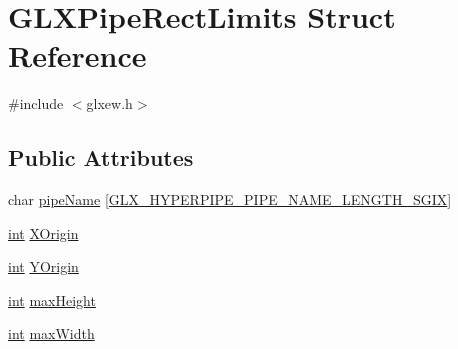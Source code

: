 \hypertarget{struct_g_l_x_pipe_rect_limits}{\section{G\-L\-X\-Pipe\-Rect\-Limits Struct Reference}
\label{struct_g_l_x_pipe_rect_limits}
}


{\ttfamily \#include $<$glxew.\-h$>$}

\subsection*{Public Attributes}
\begin{DoxyCompactItemize}
\item 
char \hyperlink{struct_g_l_x_pipe_rect_limits_a048e870a1e04bc5321d629e803cc04e1}{pipe\-Name} \mbox{[}\hyperlink{_g_l_tools_2include_2_g_l_2glxew_8h_ae1c8261c0861010d8003a31d07e26005}{G\-L\-X\-\_\-\-H\-Y\-P\-E\-R\-P\-I\-P\-E\-\_\-\-P\-I\-P\-E\-\_\-\-N\-A\-M\-E\-\_\-\-L\-E\-N\-G\-T\-H\-\_\-\-S\-G\-I\-X}\mbox{]}
\item 
\hyperlink{_s_d_l__thread_8h_a6a64f9be4433e4de6e2f2f548cf3c08e}{int} \hyperlink{struct_g_l_x_pipe_rect_limits_a3e5a965059d9f5d2ca42acd35af5bb9b}{X\-Origin}
\item 
\hyperlink{_s_d_l__thread_8h_a6a64f9be4433e4de6e2f2f548cf3c08e}{int} \hyperlink{struct_g_l_x_pipe_rect_limits_a50e06bcf0dae95854be7d93a515199e9}{Y\-Origin}
\item 
\hyperlink{_s_d_l__thread_8h_a6a64f9be4433e4de6e2f2f548cf3c08e}{int} \hyperlink{struct_g_l_x_pipe_rect_limits_a27572e499c0d3280031c2ad8e387c0c1}{max\-Height}
\item 
\hyperlink{_s_d_l__thread_8h_a6a64f9be4433e4de6e2f2f548cf3c08e}{int} \hyperlink{struct_g_l_x_pipe_rect_limits_a8662c7a712b30620e25fc994adf337a1}{max\-Width}
\end{DoxyCompactItemize}


